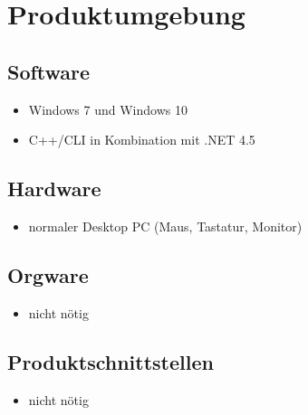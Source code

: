 \documentclass[a4paper,10pt]{report}
\begin{document}
\section{Produktumgebung}
\subsection{Software}
\begin{itemize}
\item Windows 7 und Windows 10
\item C++/CLI in Kombination mit .NET 4.5
\end{itemize}
\subsection{Hardware}
\begin{itemize}
\item normaler Desktop PC (Maus, Tastatur, Monitor)
\end{itemize}
\subsection{Orgware}
\begin{itemize}
\item nicht nötig
\end{itemize}
\subsection{Produktschnittstellen}
\begin{itemize}
\item nicht nötig
\end{itemize}
\newpage
\end{document}
